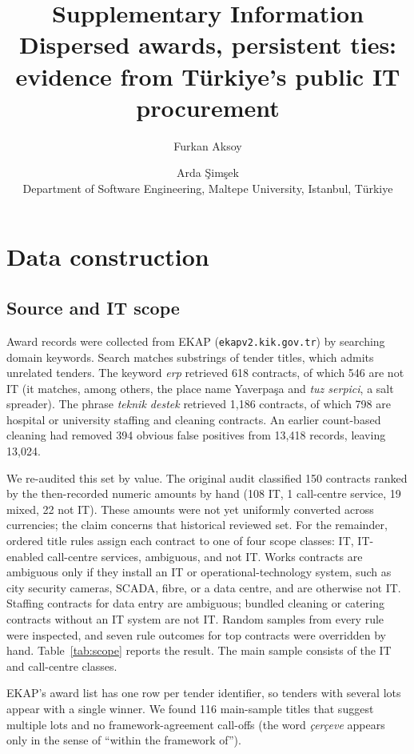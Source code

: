 \documentclass[11pt,a4paper]{article}
\title{\textbf{Supplementary Information}\\[4pt]\large Dispersed awards, persistent ties: evidence from Türkiye's public IT procurement}
\author{Furkan Aksoy \and Arda Şimşek\\[2pt]\small Department of Software Engineering, Maltepe University, Istanbul, Türkiye}
\date{}
\begin{document}
\maketitle
\tableofcontents

\section{Data construction}

\subsection{Source and IT scope}
Award records were collected from EKAP (\texttt{ekapv2.kik.gov.tr}) by searching domain keywords. Search matches substrings of tender titles, which admits unrelated tenders. The keyword \emph{erp} retrieved 618 contracts, of which 546 are not IT (it matches, among others, the place name Yaverpaşa and \emph{tuz serpici}, a salt spreader). The phrase \emph{teknik destek} retrieved 1,186 contracts, of which 798 are hospital or university staffing and cleaning contracts. An earlier count-based cleaning had removed 394 obvious false positives from 13,418 records, leaving 13,024.

We re-audited this set by value. The original audit classified 150 contracts ranked by the then-recorded numeric amounts by hand (108 IT, 1 call-centre service, 19 mixed, 22 not IT). These amounts were not yet uniformly converted across currencies; the claim concerns that historical reviewed set. For the remainder, ordered title rules assign each contract to one of four scope classes: IT, IT-enabled call-centre services, ambiguous, and not IT. Works contracts are ambiguous only if they install an IT or operational-technology system, such as city security cameras, SCADA, fibre, or a data centre, and are otherwise not IT. Staffing contracts for data entry are ambiguous; bundled cleaning or catering contracts without an IT system are not IT. Random samples from every rule were inspected, and seven rule outcomes for top contracts were overridden by hand. Table~\ref{tab:scope} reports the result. The main sample consists of the IT and call-centre classes.

EKAP's award list has one row per tender identifier, so tenders with several lots appear with a single winner. We found 116 main-sample titles that suggest multiple lots and no framework-agreement call-offs (the word \emph{çerçeve} appears only in the sense of ``within the framework of'').
\end{document}
